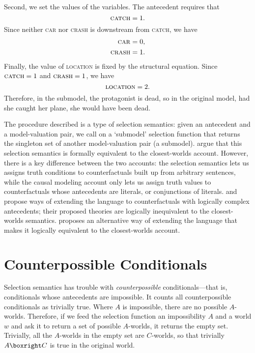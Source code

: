 Second, we set the values of the variables.  The antecedent requires that
$$  \text{\textsc{catch}} = 1.  $$
Since neither \textsc{car} nor \textsc{crash} is downstream from \textsc{catch}, we have
$$
  \begin{aligned}
	\text{\textsc{car}} &= 0,\\
	\text{\textsc{crash}} &= 1.
  \end{aligned}
$$
Finally, the value of \textsc{location} is fixed by the structural equation.  Since $\text{\textsc{catch}} = 1$ and $\text{\textsc{crash}} = 1$, we have
$$  \text{\textsc{location}} = 2.  $$
Therefore, in the submodel, the protagonist is dead, so in the original model, had she caught her plane, she would have been dead.

The procedure described is a type of selection semantics: given an antecedent and a model-valuation pair, we call on a `submodel' selection function that returns the singleton set of another model-valuation pair (a submodel).  \citet{Galles1998-GALAAC} argue that this selection semantics is formally equivalent to the closest-worlds account.  However, there is a key difference between the two accounts: the selection semantics lets us assigns truth conditions to counterfactuals built up from arbitrary sentences, while the causal modeling account only lets us assign truth values to counterfactuals whose antecedents are literals, or conjunctions of literals.  \citet{Schulz2011-SCHIYW-2} and \citet{Briggs2012-BRIIC} propose ways of extending the language to counterfactuals with logically complex antecedents; their proposed theories are logically inequivalent to the closest-worlds semantics. \citet{Huber2013-HUBSEA} proposes an alternative way of extending the language that makes it logically equivalent to the closest-worlds account.

\section{Counterpossible Conditionals}

Selection semantics has trouble with \emph{counterpossible} conditionals---that is, conditionals whose antecedents are impossible.  It counts all counterpossible conditionals as trivially true.  Where $A$ is impossible, there are no possible $A$-worlds.  Therefore, if we feed the selection function an impossibility $A$ and a world $w$ and ask it to return a set of possible $A$-worlds, it returns the empty set.  Trivially, all the $A$-worlds in the empty set are $C$-worlds, so that trivially $A \boxright C$ is true in the original world.

